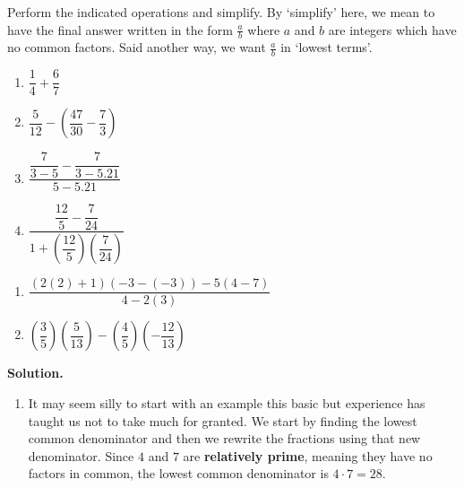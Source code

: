 \documentclass{ximera}
\begin{document}
\begin{example} \label{fractionreview}  Perform the indicated operations and simplify. By `simplify' here, we mean to have the final answer written in the form $\frac{a}{b}$ where $a$ and $b$ are integers which have no common factors.  Said another way, we want $\frac{a}{b}$ in `lowest terms'.

\begin{multicols}{4}
\begin{enumerate}

\item $\dfrac{1}{4} + \dfrac{6}{7}$
\item $\dfrac{5}{12} - \left(\dfrac{47}{30} - \dfrac{7}{3}\right)$
\item $\dfrac{\dfrac{7}{3-5} - \dfrac{7}{3-5.21}}{5-5.21}$
\item $\dfrac{\dfrac{12}{5} - \dfrac{7}{24}}{1 + \left(\dfrac{12}{5}\right) \left(\dfrac{7}{24}\right)}$ 

\setcounter{HW}{\value{enumi}}
\end{enumerate}
\end{multicols}


\begin{multicols}{2}
\begin{enumerate}
\setcounter{enumi}{\value{HW}}

\item $\dfrac{(2(2)+1)(-3-(-3)) - 5(4-7)}{4-2(3)}$
\item $\left(\dfrac{3}{5} \right) \left(\dfrac{5}{13} \right) - \left(\dfrac{4}{5}\right) \left( - \dfrac{12}{13}\right)$

\setcounter{HW}{\value{enumi}}
\end{enumerate}
\end{multicols}

{\bf Solution.}

\begin{enumerate}

\item It may seem silly to start with an example this basic but experience has taught us not to take much for granted.  We start by finding the lowest common denominator and then we rewrite the fractions using that new denominator.  Since $4$ and $7$ are {\bf relatively prime}, meaning they have no factors in common, the lowest common denominator is $4 \cdot 7 = 28$.\[ \begin{array}{rclr}


\end{array}\]
\end{enumerate}
\end{example}
\end{document}
